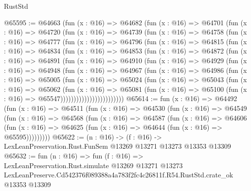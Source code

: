 \begin{lexlean}{RustStd}
\begin{coremodule}
@65595 := @64663
    (fun (x : @16) =>
    @64682
      (fun (x : @16) =>
      @64701
        (fun (x : @16) =>
        @64720
          (fun (x : @16) =>
          @64739
            (fun (x : @16) =>
            @64758
              (fun (x : @16) =>
              @64777
                (fun (x : @16) =>
                @64796
                  (fun (x : @16) =>
                  @64815
                    (fun (x : @16) =>
                    @64834
                      (fun (x : @16) =>
                      @64853
                        (fun (x : @16) =>
                        @64872
                          (fun (x : @16) =>
                          @64891
                            (fun (x : @16) =>
                            @64910
                              (fun (x : @16) =>
                              @64929
                                (fun (x : @16) =>
                                @64948
                                  (fun (x : @16) =>
                                  @64967
                                    (fun (x : @16) =>
                                    @64986
                                      (fun (x : @16) =>
                                      @65005
                                        (fun (x : @16) =>
                                        @65024
                                          (fun (x : @16) =>
                                          @65043
                                            (fun (x : @16) =>
                                            @65062
                                              (fun (x : @16) =>
                                              @65081
                                                (fun (x : @16) =>
                                                @65100
                                                  (fun (x : @16) => @65547))))))))))))))))))))))))
@65614 := fun (x : @16) =>
  @64492
    (fun (x : @16) =>
    @64511
      (fun (x : @16) =>
      @64530
        (fun (x : @16) =>
        @64549
          (fun (x : @16) =>
          @64568
            (fun (x : @16) =>
            @64587
              (fun (x : @16) =>
              @64606
                (fun (x : @16) => @64625 (fun (x : @16) => @64644 (fun (x : @16) => @65595)))))))))
@65622 := (n : @16) ->
  (f : @16) -> LexLeanPreservation.Rust.FunSem @13269 @13271 @13273 @13353 @13309
@65632 := fun (n : @16) =>
  fun (f : @16) =>
  LexLeanPreservation.Rust.simulate
    @13269
    @13271
    @13273
    LexLeanPreserve.Cd542376f089388a4a783f2fc4c26811f.R54.RustStd.crate_ok
    @13353
    @13309
\end{coremodule}
\end{lexlean}
